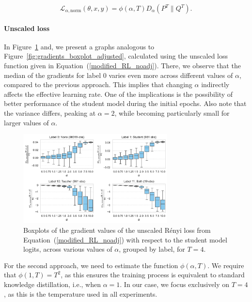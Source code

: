 \begin{equation}
	\mathcal{L}_{\alpha,\text{norm}}(\theta,x,y) = \phi(\alpha,T) D_\alpha(P^T \| Q^T).
	\label{modified_RL_sigmoid}
\end{equation} 

\paragraph{Unscaled loss} In Figure~\ref{fig:gradients_boxplot_noadj} and, we present a graphs analogous to Figure~\ref{fig:gradients_boxplot_adjusted}, calculated using the unscaled loss function given in Equation~(\ref{modified_RL_noadj}). There, we observe that the median of the gradients for label 0 varies even more across different values of $\alpha$, compared to the previous approach. This implies that changing $\alpha$ indirectly affects the effective learning rate. One of the implications is the possibility of better performance of the student model during the initial epochs. Also note that the variance differs, peaking at $\alpha = 2$, while becoming particularly small for larger values of $\alpha$.

\begin{figure}[h!]
	\centering
	\includegraphics[width=0.7\textwidth]{../img/gradients_boxplot_noadj.pdf}
	\caption{Boxplots of the gradient values of the unscaled Rényi loss from Equation~(\ref{modified_RL_noadj}) with respect to the student model logits, across various values of $\alpha$, grouped by label, for $T=4$.}
	\label{fig:gradients_boxplot_noadj}
\end{figure}

For the second approach, we need to estimate the function $\phi(\alpha,T)$. We require that $\phi(1,T)=T^2$, as this ensures the training process is equivalent to standard knowledge distillation, i.e., when $\alpha=1$. In our case, we focus exclusively on $T=4$, as this is the temperature used in all experiments.

